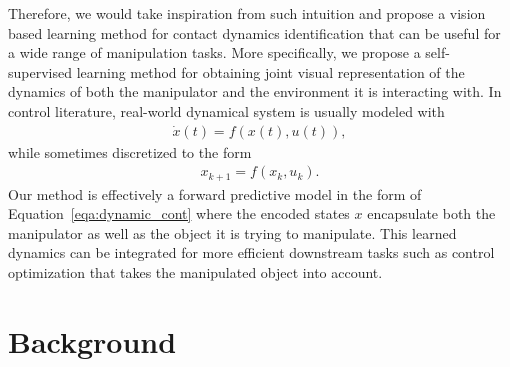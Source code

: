\documentclass[conference]{IEEEtran}
\begin{document}
Therefore, we would take inspiration
from such intuition and propose a vision based learning method
for contact dynamics identification that can be useful for a wide range of
manipulation tasks. More specifically, we propose a self-supervised
learning method for obtaining joint visual representation of the dynamics of both
the manipulator and the environment it is interacting with. In control
literature, real-world dynamical system is usually modeled with
\begin{gather}\label{eqa:dynamic_cont}
  \dot{x}(t) = f(x(t), u(t)),
\end{gather}
while sometimes discretized to the form
\begin{gather}\label{eqa:dynamic_disc}
  x_{k+1} = f(x_k, u_k).
\end{gather}
Our method is effectively a forward predictive model in the form of
Equation~\ref{eqa:dynamic_cont} where the encoded states $x$ encapsulate both the
manipulator as well as the object it is trying to manipulate. This learned
dynamics can be integrated for more efficient downstream tasks such as
control optimization that takes the manipulated object into account.

\section{Background}
\end{document}
